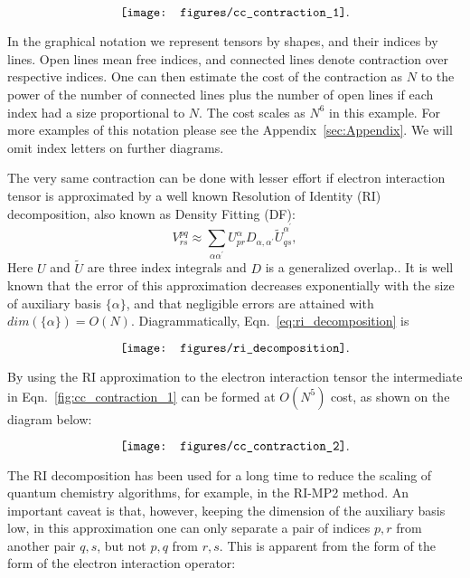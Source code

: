 \begin{equation}
\vcenter{\hbox{\texttt{[image: figures/cc\_contraction\_1]}}}
.
\label{fig:cc_contraction_1}
\end{equation}

In the graphical notation we represent tensors by shapes, and their indices by 
lines. Open lines mean free indices, and connected lines denote contraction 
over respective indices. One can then estimate the cost of the contraction as 
$N$ to the power of the number of connected lines plus the number of 
open lines if each index had a size proportional to $N$. The cost scales 
as $N^6$ in this example. For more examples of this notation please see the 
Appendix~\ref{sec:Appendix}. We will omit index letters on further diagrams.

The very same contraction can be done with lesser effort if electron 
interaction tensor is approximated by a well known\cite{beebe1977, 
vahtras1993integral, boman2008method, sierka2003fast} Resolution of Identity 
(RI) decomposition, also known as Density Fitting (DF):
%
\begin{equation} V^{pq}_{rs} \approx \sum_{\alpha \alpha^{\prime}} 
U_{pr}^{\alpha}
D_{\alpha,\alpha^{\prime}} \tilde{U}_{qs}^{\alpha^{\prime}},
\label{eq:ri_decomposition}
\end{equation}
Here $U$ and $\tilde{U}$ are three index integrals and $D$ is a generalized 
overlap.\cite{ahmadi1995coulomb}. It is well known that the 
error of this approximation decreases exponentially with the 
size of auxiliary basis $\{ \alpha \}$, and that negligible errors are attained 
with $dim(\{ \alpha \}) = O(N)$.\cite{beebe1977, sierka2003fast} 
Diagrammatically, Eqn.~\ref{eq:ri_decomposition} is

\begin{equation}
\vcenter{\hbox{\texttt{[image: figures/ri\_decomposition]}}}
.
\label{fig:ri_decomposition}
\end{equation}

By using the RI approximation to the electron interaction tensor the 
intermediate in Eqn.~\ref{fig:cc_contraction_1} can be formed at $O(N^5)$ cost, 
as shown on the diagram below:

\begin{equation}
\vcenter{\hbox{\texttt{[image: figures/cc\_contraction\_2]}}}
.
\label{fig:cc_contraction_2}
\end{equation}

The RI decomposition has been used for a long time to reduce the
scaling of quantum chemistry algorithms, for example, in the RI-MP2
method.\cite{ayala1999linear, werner2003fast, izmaylov2008resolution} An 
important caveat is that, however, keeping the dimension of the auxiliary 
basis low, in this approximation one can only separate a pair of indices $p, r$ 
from another pair $q, s$, but not $p, q$ from $r, s$. This is 
apparent from the form of the form of the electron interaction operator:


